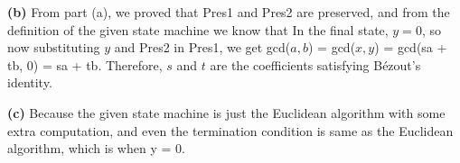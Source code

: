 \documentclass{article}
\begin{document}
\vspace{\baselineskip}
\noindent\textbf{(b)} From part (a), we proved that Pres1 and Pres2 are preserved, and from the definition of the given state machine we know that
In the final state, $y = 0$, so now substituting $y$ and Pres2 in Pres1, we get gcd($a, b$) = gcd($x, y$) = gcd(sa + tb, 0) = sa + tb.
Therefore, $s$ and $t$ are the coefficients satisfying B\'ezout's identity.

\vspace{\baselineskip}
\noindent\textbf{(c)} Because the given state machine is just the Euclidean algorithm with some extra computation, and even the termination condition is
same as the Euclidean algorithm, which is when y = 0.
\end{document}
